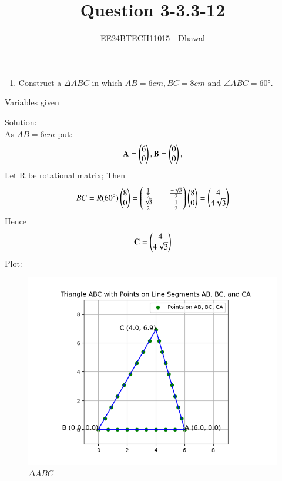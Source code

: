 \documentclass[journal]{IEEEtran}
\numberwithin{equation}{enumi}
\numberwithin{figure}{enumi}
\begin{document}

\title{Question 3-3.3-12}
\author{EE24BTECH11015 - Dhawal}
{\let\newpage\relax\maketitle}
\begin{enumerate}
\item Construct a $\Delta ABC$ in which $AB=6cm,BC=8cm\text{ and } \angle{ABC}=\ang{60}$.

\end{enumerate}

\begin{table}[h!]    
  \centering
  
  \caption{Variables given}
  \label{tab 1.4.9.2}
\end{table}

Solution:\\
As $AB=6cm$ put:
\begin{align}
       \mathbf{A}=\begin{pmatrix}6\\0\end{pmatrix}, \mathbf{B}=\begin{pmatrix}0\\0\end{pmatrix},
\end{align}
Let R be rotational matrix;
Then
\begin{align}
	BC=R(\ang{60})\begin{pmatrix}8\\0\end{pmatrix}=\begin{pmatrix}\frac{1}{2}&&\frac{-\sqrt{3}}{2}\\\frac{\sqrt{3}}{2}&&\frac{1}{2}\end{pmatrix}\begin{pmatrix}8\\0\end{pmatrix}=\begin{pmatrix}4\\4\sqrt{3}\end{pmatrix}
\end{align}
Hence
\begin{align}
	\mathbf{C}=\begin{pmatrix}4\\4\sqrt{3}\end{pmatrix}
\end{align}
Plot:
\begin{figure}[h!]
   \centering
   \includegraphics[width=0.9\linewidth]{Figure_1.png}
	\caption{$\Delta ABC$ }
   \label{stemplot}
\end{figure}
\end{document}
